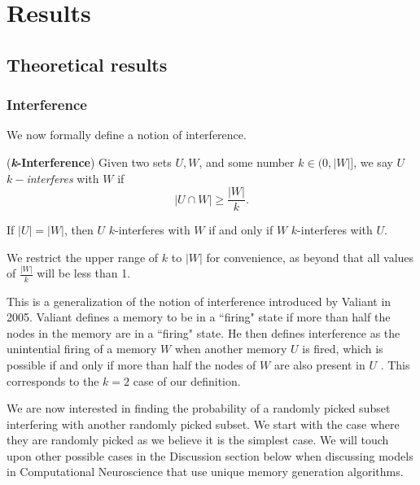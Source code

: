 \chapter{Results}

\section{Theoretical results}
\subsection{Interference}

We now formally define a notion of interference. 

\begin{definition}
    (\textbf{\textit{k}-Interference}) Given two sets $U, W$, and some number $k \in (0,|W|]$, we say $U$ $k-$\textit{interferes} with $W$ if 
    \begin{equation}
        |U \cap W| \ge  \frac{|W|}{k}.
    \end{equation}
\end{definition}

\begin{corollary}
    \label{collorary:k-int-equals}
        If $|U| = |W|$, then $U$ $k$-interferes with $W$ if and only if $W$ $k$-interferes with $U$.
    \end{corollary}
    
We restrict the upper range of $k$ to $|W|$ for convenience, as beyond that all values of $\frac{|W|}{k}$ will be less than 1.

This is a generalization of the notion of interference introduced by Valiant in 2005. Valiant defines a memory to be in a ``firing" state if more than half the nodes in the memory are in a ``firing" state. He then defines interference as the unintential firing of a memory $W$ when another memory $U$ is fired, which is possible if and only if more than half the nodes of $W$ are also present in $U$ \cite{valiant2005memorization}. This corresponds to the $k = 2$ case of our definition. 

We are now interested in finding the probability of a randomly picked subset interfering with another randomly picked subset. We start with the case where they are randomly picked as we believe it is the simplest case. We will touch upon other possible cases in the Discussion section below when discussing models in Computational Neuroscience that use unique memory generation algorithms.

